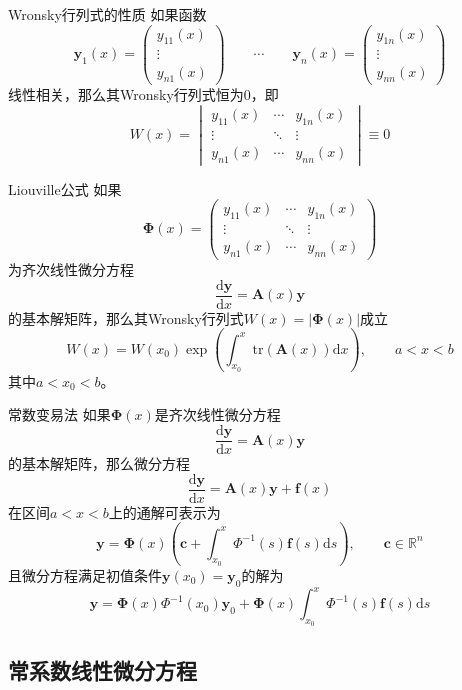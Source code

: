 \documentclass[lang = cn, scheme = chinese, thmcnt = section]{elegantbook}
\newcommand{\R}{\mathbb{R}}            %
\newcommand{\bs}{\boldsymbol}          %
\begin{document}
\begin{proposition}{Wronsky行列式的性质}
	如果函数
	$$
	\bs{y}_1(x)=\left(\begin{matrix}y_{11}(x)\\\vdots\\y_{n1}(x)\end{matrix}\right)\qquad 
	\cdots\qquad 
	\bs{y}_n(x)=\left(\begin{matrix}y_{1n}(x)\\\vdots\\y_{nn}(x)\end{matrix}\right)
	$$
	线性相关，那么其Wronsky行列式恒为$0$，即
	$$
	W(x)=\begin{vmatrix}
		y_{11}(x)&\cdots&y_{1n}(x)\\
		\vdots&\ddots&\vdots\\
		y_{n1}(x)&\cdots&y_{nn}(x)
	\end{vmatrix}\equiv0
	$$
\end{proposition}

\begin{theorem}{Liouville公式}
	如果
	$$
	\bs{\Phi}(x)=\left(\begin{matrix}
		y_{11}(x)&\cdots&y_{1n}(x)\\
		\vdots&\ddots&\vdots\\
		y_{n1}(x)&\cdots&y_{nn}(x)
	\end{matrix}\right)
	$$
	为齐次线性微分方程
	$$
	\frac{\mathrm{d}\bs{y}}{\mathrm{d}x}=\bs{A}(x)\bs{y}
	$$
	的基本解矩阵，那么其Wronsky行列式$W(x)=|\bs{\Phi}(x)|$成立
	$$
	W(x)=W(x_0)\exp\left(\int_{x_0}^{x}{\text{tr}(\bs{A}(x))\mathrm{d}x}\right),\qquad a<x<b
	$$
	其中$a<x_0<b$。
\end{theorem}

\begin{theorem}{常数变易法}
	如果$\bs{\Phi}(x)$是齐次线性微分方程
	$$
	\frac{\mathrm{d}\bs{y}}{\mathrm{d}x}=\bs{A}(x)\bs{y}
	$$
	的基本解矩阵，那么微分方程
	$$
	\frac{\mathrm{d}\bs{y}}{\mathrm{d}x}=\bs{A}(x)\bs{y}+\bs{f}(x)
	$$
	在区间$a<x<b$上的通解可表示为
	$$
	\bs{y}=\bs{\Phi}(x)\left(\bs{c}+\int_{x_0}^{x}{\Phi^{-1}(s)\bs{f}(s)\mathrm{d}s}\right),\qquad \bs{c}\in\R^n
	$$
	且微分方程满足初值条件$\bs{y}(x_0)=\bs{y}_0$的解为
	$$
	\bs{y}=\bs{\Phi}(x)\Phi^{-1}(x_0)\bs{y}_0+\bs{\Phi}(x)\int_{x_0}^{x}{\Phi^{-1}(s)\bs{f}(s)\mathrm{d}s}
	$$
\end{theorem}

\subsection{常系数线性微分方程}
\end{document}
